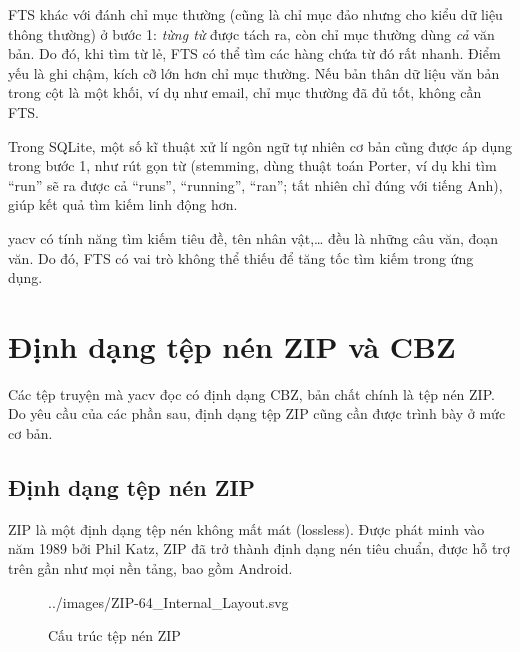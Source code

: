 \documentclass[../../thesis]{subfiles}
\begin{document}
FTS khác với đánh chỉ mục thường (cũng là chỉ mục đảo nhưng cho kiểu dữ liệu
thông thường) ở bước 1: \emph{từng từ} được tách ra, còn chỉ mục thường dùng
\emph{cả} văn bản. Do đó, khi tìm từ lẻ, FTS có thể tìm các hàng chứa từ đó rất
nhanh. Điểm yếu là ghi chậm, kích cỡ lớn hơn chỉ mục thường. Nếu bản thân dữ
liệu văn bản trong cột là một khối, ví dụ như email, chỉ mục thường đã đủ tốt,
không cần FTS.

Trong SQLite, một số kĩ thuật xử lí ngôn ngữ tự nhiên cơ bản cũng được áp dụng
trong bước 1, như rút gọn từ (stemming, dùng thuật toán Porter, ví dụ khi tìm
``run'' sẽ ra được cả ``runs'', ``running'', ``ran''; tất nhiên chỉ đúng với
tiếng Anh), giúp kết quả tìm kiếm linh động hơn.

yacv có tính năng tìm kiếm tiêu đề, tên nhân vật,\ldots{} đều là những câu văn,
đoạn văn. Do đó, FTS có vai trò không thể thiếu để tăng tốc tìm kiếm trong ứng
dụng.



\section{Định dạng tệp nén ZIP và CBZ}\label{sec:zip-cbz}

Các tệp truyện mà yacv đọc có định dạng CBZ, bản chất chính là tệp nén ZIP. Do
yêu cầu của các phần sau, định dạng tệp ZIP cũng cần được trình bày ở mức cơ
bản.

\subsection{Định dạng tệp nén ZIP}\label{sec:zip}

ZIP là một định dạng tệp nén không mất mát (lossless). Được phát minh vào năm
1989 bởi Phil Katz, ZIP đã trở thành định dạng nén tiêu chuẩn, được hỗ trợ trên
gần như mọi nền tảng, bao gồm Android.

\begin{figure}
    \centering
    \vspace*{-6mm}
    
        {../images/ZIP-64_Internal_Layout.svg}
    \caption{Cấu trúc tệp nén ZIP \cite{WIKI_ZIP}}
    \label{fig:zip-layout}
\end{figure}
\end{document}
